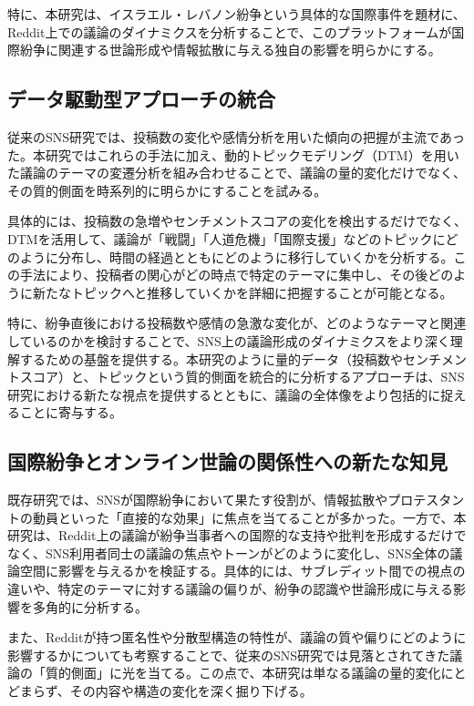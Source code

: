 \documentclass[11pt, a4j]{jreport}
\begin{document}
    特に、本研究は、イスラエル・レバノン紛争という具体的な国際事件を題材に、Reddit上での議論のダイナミクスを分析することで、このプラットフォームが国際紛争に関連する世論形成や情報拡散に与える独自の影響を明らかにする。

    \subsection{データ駆動型アプローチの統合}
    従来のSNS研究では、投稿数の変化や感情分析を用いた傾向の把握が主流であった。本研究ではこれらの手法に加え、動的トピックモデリング（DTM）を用いた議論のテーマの変遷分析を組み合わせることで、議論の量的変化だけでなく、その質的側面を時系列的に明らかにすることを試みる。

    具体的には、投稿数の急増やセンチメントスコアの変化を検出するだけでなく、DTMを活用して、議論が「戦闘」「人道危機」「国際支援」などのトピックにどのように分布し、時間の経過とともにどのように移行していくかを分析する。この手法により、投稿者の関心がどの時点で特定のテーマに集中し、その後どのように新たなトピックへと推移していくかを詳細に把握することが可能となる。

    特に、紛争直後における投稿数や感情の急激な変化が、どのようなテーマと関連しているのかを検討することで、SNS上の議論形成のダイナミクスをより深く理解するための基盤を提供する。本研究のように量的データ（投稿数やセンチメントスコア）と、トピックという質的側面を統合的に分析するアプローチは、SNS研究における新たな視点を提供するとともに、議論の全体像をより包括的に捉えることに寄与する。

    \subsection{国際紛争とオンライン世論の関係性への新たな知見}
    既存研究では、SNSが国際紛争において果たす役割が、情報拡散やプロテスタントの動員といった「直接的な効果」に焦点を当てることが多かった。一方で、本研究は、Reddit上の議論が紛争当事者への国際的な支持や批判を形成するだけでなく、SNS利用者同士の議論の焦点やトーンがどのように変化し、SNS全体の議論空間に影響を与えるかを検証する。具体的には、サブレディット間での視点の違いや、特定のテーマに対する議論の偏りが、紛争の認識や世論形成に与える影響を多角的に分析する。

    また、Redditが持つ匿名性や分散型構造の特性が、議論の質や偏りにどのように影響するかについても考察することで、従来のSNS研究では見落とされてきた議論の「質的側面」に光を当てる。この点で、本研究は単なる議論の量的変化にとどまらず、その内容や構造の変化を深く掘り下げる。
\end{document}
